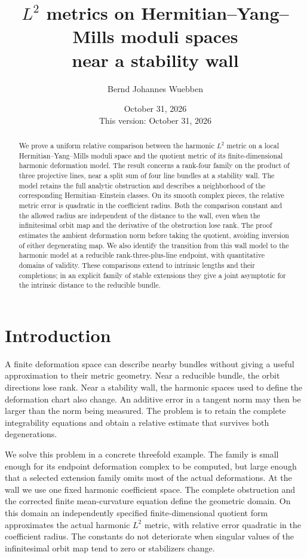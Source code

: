 \documentclass[11pt]{amsart}
\title[HYM moduli metrics near a stability wall]{$L^2$ metrics on Hermitian--Yang--Mills moduli spaces\\near a stability wall}
\author{Bernd Johannes Wuebben}
\date{October 31, 2026\\This version: October 31, 2026}
\theoremstyle{definition}
\theoremstyle{remark}
\begin{document}
\begin{abstract}
We prove a uniform relative comparison between the harmonic $L^2$
metric on a local Hermitian--Yang--Mills moduli space and the quotient
metric of its finite-dimensional harmonic deformation model. The result
concerns a rank-four family on the product of three projective lines,
near a split sum of four line bundles at a stability wall. The model
retains the full analytic obstruction and describes a neighborhood of
the corresponding Hermitian--Einstein classes. On its smooth complex
pieces, the relative metric error is quadratic in the coefficient
radius. Both the comparison constant and the allowed radius are
independent of the distance to the wall, even when the infinitesimal
orbit map and the derivative of the obstruction lose rank. The proof
estimates the ambient deformation norm before taking the quotient,
avoiding inversion of either degenerating map. We also identify the
transition from this wall model to the harmonic model at a reducible
rank-three-plus-line endpoint, with quantitative domains of validity.
These comparisons extend to intrinsic lengths and their completions;
in an explicit family of stable extensions they give a joint
asymptotic for the intrinsic distance to the reducible bundle.
\end{abstract}

\maketitle


\section{Introduction}\label{sec:introduction}

A finite deformation space can describe nearby bundles without giving a
useful approximation to their metric geometry. Near a reducible bundle,
the orbit directions lose rank. Near a stability wall, the harmonic
spaces used to define the deformation chart also change. An additive
error in a tangent norm may then be larger than the norm being measured.
The problem is to retain the complete integrability equations and obtain
a relative estimate that survives both degenerations.

We solve this problem in a concrete threefold example. The family is
small enough for its endpoint deformation complex to be computed, but
large enough that a selected extension family omits most of the actual
deformations. At the wall we use one fixed harmonic coefficient space.
The complete obstruction and the corrected finite mean-curvature equation
define the geometric domain. On this domain an independently specified
finite-dimensional quotient form approximates the actual harmonic $L^2$ metric, with
relative error quadratic in the coefficient radius. The constants do
not deteriorate when singular values of the infinitesimal orbit map
tend to zero or stabilizers change.
\end{document}
